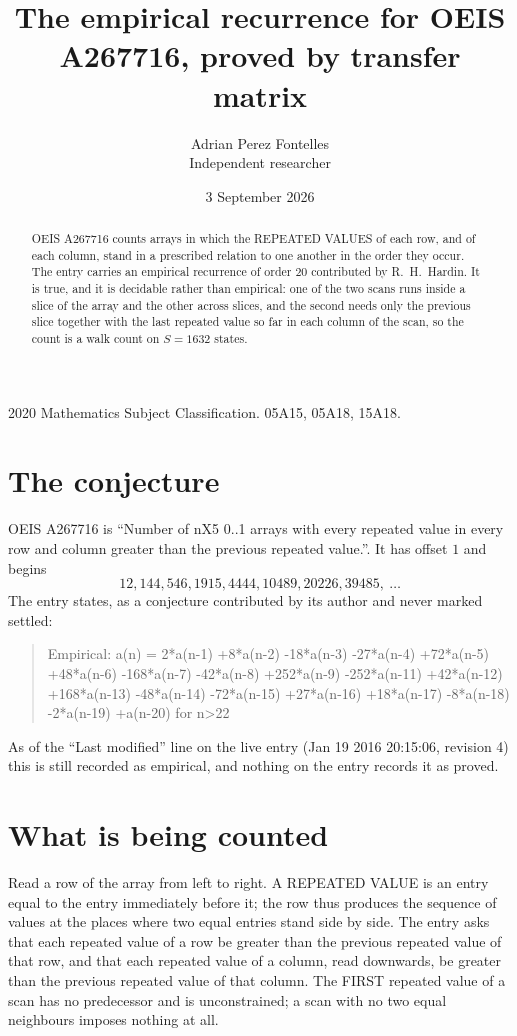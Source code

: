 \documentclass[11pt,a4paper]{article}
\title{The empirical recurrence for OEIS A267716, proved by transfer matrix}
\author{Adrian Perez Fontelles\\ \small Independent researcher}
\date{3 September 2026}
\theoremstyle{plain}
\theoremstyle{definition}
\begin{document}
\maketitle

\begin{abstract}
OEIS A267716 counts arrays in which the REPEATED VALUES of each row, and of each column, stand in a
prescribed relation to one another in the order they occur. The entry carries an empirical
recurrence of order $20$ contributed by R.~H.~Hardin. It is true, and it is decidable
rather than empirical: one of the two scans runs inside a slice of the array and the other
across slices, and the second needs only the previous slice together with the last repeated
value so far in each column of the scan, so the count is a walk count on $S=1632$ states.
\end{abstract}

\noindent\small 2020 Mathematics Subject Classification. 05A15, 05A18, 15A18.\normalsize

\section{The conjecture}

OEIS A267716 is ``Number of nX5 0..1 arrays with every repeated value in every row and column greater than the previous repeated value.''. It has offset $1$ and begins
\[
12, 144, 546, 1915, 4444, 10489, 20226, 39485,\ \dots
\]
The entry states, as a conjecture contributed by its author and never marked settled:
\begin{quote}
Empirical: a(n) = 2*a(n-1) +8*a(n-2) -18*a(n-3) -27*a(n-4) +72*a(n-5) +48*a(n-6) -168*a(n-7) -42*a(n-8) +252*a(n-9) -252*a(n-11) +42*a(n-12) +168*a(n-13) -48*a(n-14) -72*a(n-15) +27*a(n-16) +18*a(n-17) -8*a(n-18) -2*a(n-19) +a(n-20) for n>22
\end{quote}
As of the ``Last modified'' line on the live entry (Jan 19 2016 20:15:06, revision 4) this is still
recorded as empirical, and nothing on the entry records it as proved.

\section{What is being counted}

Read a row of the array from left to right. A REPEATED VALUE is an entry equal to the entry
immediately before it; the row thus produces the sequence of values at the places where two
equal entries stand side by side. The entry asks that each repeated value of a row be
greater than the previous repeated value of that row, and that each repeated value of a column,
read downwards, be greater than the previous repeated value of that column. The FIRST repeated
value of a scan has no predecessor and is unconstrained; a scan with no two equal neighbours
imposes nothing at all.
\end{document}
